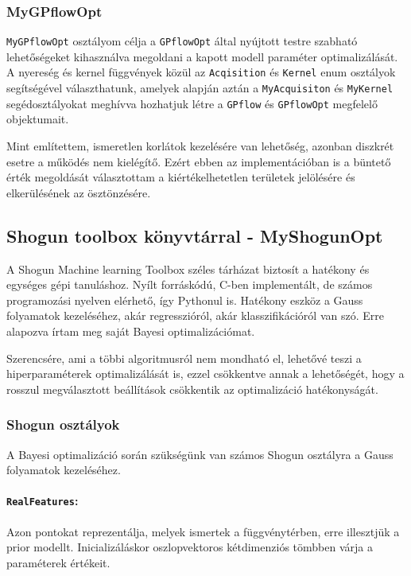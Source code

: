 \subsubsection{MyGPflowOpt}
\texttt{MyGPflowOpt} osztályom célja a \texttt{GPflowOpt} által nyújtott testre szabható lehetőségeket kihasználva megoldani a kapott modell paraméter optimalizálását. A nyereség és kernel függvények közül az \texttt{Acqisition} és \texttt{Kernel} enum osztályok segítségével választhatunk, amelyek alapján aztán a \texttt{MyAcquisiton} és \texttt{MyKernel} segédosztályokat meghívva hozhatjuk létre a \texttt{GPflow} és \texttt{GPflowOpt} megfelelő objektumait.

Mint említettem, ismeretlen korlátok kezelésére van lehetőség, azonban diszkrét esetre a működés nem kielégítő. Ezért ebben az implementációban is a büntető érték megoldását választottam a kiértékelhetetlen területek jelölésére és elkerülésének az ösztönzésére.

\subsection{Shogun toolbox könyvtárral - MyShogunOpt}

A Shogun Machine learning Toolbox széles tárházat biztosít a hatékony és egységes gépi tanuláshoz. Nyílt forráskódú, C-ben implementált, de számos programozási nyelven elérhető, így Pythonul is. Hatékony eszköz a Gauss folyamatok kezeléséhez, akár regresszióról, akár klasszifikációról van szó. Erre alapozva írtam meg saját Bayesi optimalizációmat. 

Szerencsére, ami a többi algoritmusról nem mondható el, lehetővé teszi a hiperparaméterek optimalizálását is, ezzel csökkentve annak a lehetőségét, hogy a rosszul megválasztott beállítások csökkentik az optimalizáció hatékonyságát.

\subsubsection{Shogun osztályok}

A Bayesi optimalizáció során szükségünk van számos Shogun osztályra a Gauss folyamatok kezeléséhez.
\paragraph{\texttt{RealFeatures}:}
Azon pontokat reprezentálja, melyek ismertek a függvénytérben, erre illesztjük a prior modellt. Inicializáláskor oszlopvektoros kétdimenziós tömbben várja a paraméterek értékeit.
